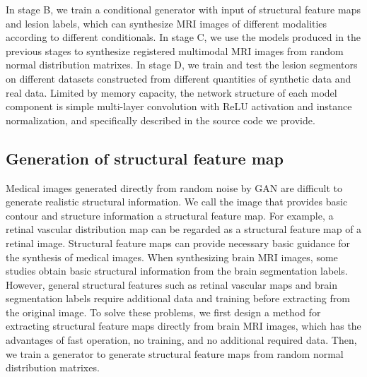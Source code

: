 \documentclass[runningheads]{llncs}
\begin{document}
In stage B, we train a conditional generator with input of structural feature maps and lesion labels, which can synthesize MRI images of different modalities according to different conditionals.
In stage C, we use the models produced in the previous stages to synthesize registered multimodal MRI images from random normal distribution matrixes. 
In stage D, we train and test the lesion segmentors on different datasets constructed from different quantities of synthetic data and real data.
Limited by memory capacity, the network structure of each model component is simple multi-layer convolution with ReLU activation and instance normalization, and specifically described in the source code we provide. 

\subsection{Generation of structural feature map}
Medical images generated directly from random noise by GAN are difficult to generate realistic structural information. We call the image that provides basic contour and structure information a structural feature map. For example, a retinal vascular distribution map can be regarded as a structural feature map of a retinal image\cite{41costa2017towards}. Structural feature maps can provide necessary basic guidance for the synthesis of medical images. When synthesizing brain MRI images, some studies obtain basic structural information from the brain segmentation labels\cite{4shin2018medical}. However, general structural features such as retinal vascular maps and brain segmentation labels require additional data and training before extracting from the original image. To solve these problems, we first design a method for extracting structural feature maps directly from brain MRI images, which has the advantages of fast operation, no training, and no additional required data. Then, we train a generator to generate structural feature maps from random normal distribution matrixes.
\end{document}
